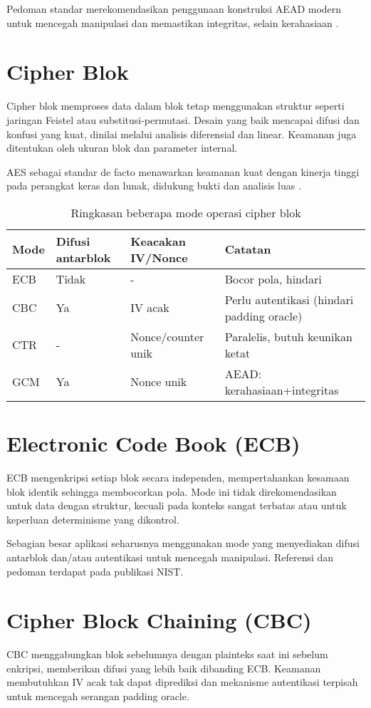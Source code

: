 \documentclass[../main.tex]{subfiles}
\begin{document}
Pedoman standar merekomendasikan penggunaan konstruksi AEAD modern untuk mencegah manipulasi dan memastikan integritas, selain kerahasiaan \parencite{rfc5116}.

\section{Cipher Blok}
Cipher blok memproses data dalam blok tetap menggunakan struktur seperti jaringan Feistel atau substitusi-permutasi. Desain yang baik mencapai difusi dan konfusi yang kuat, dinilai melalui analisis diferensial dan linear. Keamanan juga ditentukan oleh ukuran blok dan parameter internal.

AES sebagai standar de facto menawarkan keamanan kuat dengan kinerja tinggi pada perangkat keras dan lunak, didukung bukti dan analisis luas \parencite{fips197}.

\begin{table}[h]
\centering
\caption{Ringkasan beberapa mode operasi cipher blok}
\label{tab:modes}
\begin{tabular}{llll}
\toprule
Mode & Difusi antarblok & Keacakan IV/Nonce & Catatan \\
\midrule
ECB & Tidak & - & Bocor pola, hindari \\
CBC & Ya & IV acak & Perlu autentikasi (hindari padding oracle) \parencite{nist80038a} \\
CTR & - & Nonce/counter unik & Paralelis, butuh keunikan ketat \parencite{nist80038a} \\
GCM & Ya & Nonce unik & AEAD: kerahasiaan+integritas \parencite{nist80038d} \\
\bottomrule
\end{tabular}
\end{table}

\section{Electronic Code Book (ECB)}
ECB mengenkripsi setiap blok secara independen, mempertahankan kesamaan blok identik sehingga membocorkan pola. Mode ini tidak direkomendasikan untuk data dengan struktur, kecuali pada konteks sangat terbatas atau untuk keperluan determinisme yang dikontrol.

Sebagian besar aplikasi seharusnya menggunakan mode yang menyediakan difusi antarblok dan/atau autentikasi untuk mencegah manipulasi. Referensi dan pedoman terdapat pada publikasi NIST.

\section{Cipher Block Chaining (CBC)}
CBC menggabungkan blok sebelumnya dengan plainteks saat ini sebelum enkripsi, memberikan difusi yang lebih baik dibanding ECB. Keamanan membutuhkan IV acak tak dapat diprediksi dan mekanisme autentikasi terpisah untuk mencegah serangan padding oracle.
\end{document}
